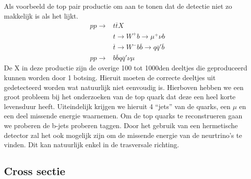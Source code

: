 \documentclass[../main.tex]{subfiles}
\begin{document}
Als voorbeeld de top pair productie om aan te tonen dat de detectie niet zo makkelijk is als het lijkt.
\begin{equation}
    \begin{aligned}
        \label{eq:top_prod}
        pp \rightarrow &t\overline t X\\
                       &t\rightarrow W^+b\rightarrow \mu^+\nu b\\
                       &\overline t \rightarrow W^-b\overline b \rightarrow q\overline q' \overline b\\
        pp \rightarrow &b\overline bq\overline q' \nu\mu
    \end{aligned}
\end{equation}
De X in deze productie zijn de overige 100 tot 1000den deeltjes die geproduceerd kunnen worden door 1 botsing. Hieruit moeten de correcte deeltjes uit gedetecteerd worden wat natuurlijk niet eenvoudig is. Hierboven hebben we een groot probleem bij het onderzoeken van de top quark dat deze een heel korte levensduur heeft. Uiteindelijk krijgen we hieruit 4 ``jets'' van de quarks, een $\mu$ en een deel missende energie waarnemen. Om de top quarks te reconstrueren gaan we proberen de b-jets proberen taggen. Door het gebruik van een hermetische detector zal het ook mogelijk zijn om de missende energie van de neurtrino's te vinden. Dit kan natuurlijk enkel in de trasversale richting.

\subsection{Cross sectie}%
\label{sub:cross_sectie}
\end{document}
